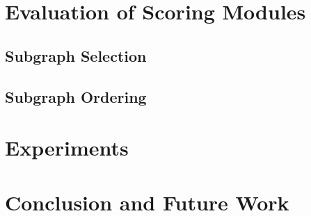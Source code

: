 \documentclass[12pt]{article}
\begin{document}
\section{Evaluation of Scoring Modules}
\subsection{Subgraph Selection}
\subsection{Subgraph Ordering}

\section{Experiments}

\section{Conclusion and Future Work}

\pagebreak


\end{document}
